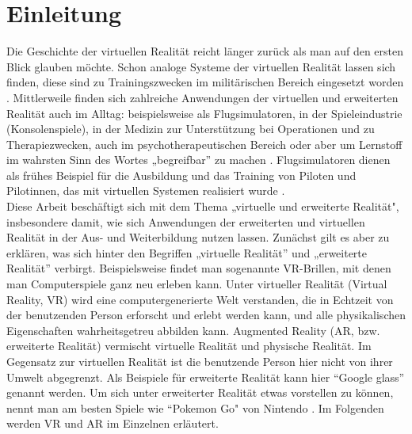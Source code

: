 \documentclass[deutsch]{llncs}
\begin{document}
\tableofcontents
\newpage
{}
\section{Einleitung}
\label{sec:intro}
Die Geschichte der virtuellen Realität reicht länger zurück als man auf den ersten Blick glauben möchte. Schon analoge Systeme der virtuellen Realität lassen sich finden, diese sind zu Trainingszwecken im militärischen Bereich eingesetzt worden \cite{vrnerds}.
Mittlerweile finden sich zahlreiche Anwendungen der virtuellen und erweiterten Realität auch im Alltag: beispielsweise als Flugsimulatoren, in der Spieleindustrie (Konsolenspiele), in der Medizin zur Unterstützung bei Operationen und zu Therapiezwecken, auch im psychotherapeutischen Bereich oder aber um Lernstoff im wahrsten Sinn des Wortes „begreifbar'' zu machen \cite{Klampfer}. 
Flugsimulatoren dienen als frühes Beispiel für die Ausbildung und das Training von Piloten und Pilotinnen, das mit virtuellen Systemen realisiert wurde  \cite{Klampfer}.\\

Diese Arbeit beschäftigt sich mit dem Thema „virtuelle und erweiterte Realität", insbesondere damit, wie sich Anwendungen der erweiterten und virtuellen Realität in der Aus- und Weiterbildung nutzen lassen. 
Zunächst gilt es aber zu erklären, was sich hinter den Begriffen „virtuelle Realität'' und „erweiterte Realität'' verbirgt. 
Beispielsweise findet man sogenannte VR-Brillen, mit denen man Computerspiele ganz neu erleben kann.
\label{sec:typo}
Unter virtueller Realität (Virtual Reality, VR) wird eine computergenerierte Welt verstanden, die in Echtzeit von der benutzenden Person erforscht und erlebt werden kann, und alle physikalischen Eigenschaften wahrheitsgetreu abbilden kann. 
Augmented Reality (AR, bzw. erweiterte Realität) vermischt virtuelle Realität und physische Realität. Im Gegensatz zur virtuellen Realität ist die benutzende Person hier nicht von ihrer Umwelt abgegrenzt.
Als Beispiele für erweiterte Realität kann hier ``Google glass'' genannt werden. 
Um sich unter erweiterter Realität etwas vorstellen zu können, nennt man am besten Spiele wie ``Pokemon Go"  von Nintendo \cite{Klampfer}. Im Folgenden werden VR und AR im Einzelnen erläutert.\\
\end{document}
